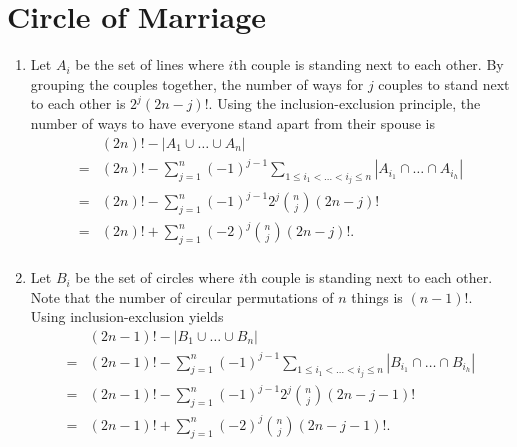 \documentclass{article}
\begin{document}
   \section{Circle of Marriage}
   \begin{enumerate}
      \item Let $A_i$ be the set of lines where $i$th couple 
         is standing next to each other.
         By grouping the couples together, the number of ways for $j$ couples 
         to stand next to each other is $2^j(2n-j)!$.
         Using the inclusion-exclusion principle, 
         the number of ways to have everyone stand apart from their spouse is 
         \begin{align*}
            &(2n)! - |A_1 \cup \hdots \cup A_n| \\
            = &(2n)! - \sum_{j=1}^n (-1)^{j-1} \sum_{1\leq i_1<\hdots<i_j\leq n} |A_{i_1}\cap\hdots \cap A_{i_h}| \\
            = &(2n)! - \sum_{j=1}^n (-1)^{j-1} 2^j \binom{n}{j} (2n-j)! \\
            = &(2n)! + \sum_{j=1}^n (-2)^{j}\binom{n}{j} (2n-j)!. \\
         \end{align*}
      \item Let $B_i$ be the set of circles where $i$th couple 
         is standing next to each other.
         Note that the number of circular permutations of $n$ things is $(n-1)!$.
         Using inclusion-exclusion yields 
         \begin{align*}
            &(2n-1)! - |B_1 \cup \hdots \cup B_n| \\
            = &(2n-1)! - \sum_{j=1}^n (-1)^{j-1} \sum_{1\leq i_1<\hdots<i_j\leq n} |B_{i_1}\cap\hdots \cap B_{i_h}| \\
            = &(2n-1)! - \sum_{j=1}^n (-1)^{j-1} 2^j \binom{n}{j} (2n-j-1)! \\
            = &(2n-1)! + \sum_{j=1}^n (-2)^{j}\binom{n}{j} (2n-j-1)!. \\
         \end{align*}
   \end{enumerate}
   \newpage
\end{document}
